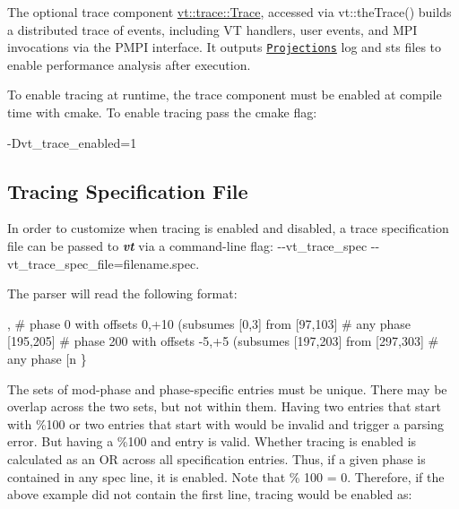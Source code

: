 The optional trace component {\ttfamily \hyperlink{structvt_1_1trace_1_1_trace}{vt\+::trace\+::\+Trace}}, accessed via {\ttfamily vt\+::the\+Trace()} builds a distributed trace of events, including VT handlers, user events, and M\+PI invocations via the P\+M\+PI interface. It outputs \href{http://charm.cs.uiuc.edu/software}{\tt Projections} log and sts files to enable performance analysis after execution.

To enable tracing at runtime, the trace component must be enabled at compile time with cmake. To enable tracing pass the cmake flag\+: 
\begin{DoxyCode}
-Dvt\_trace\_enabled=1
\end{DoxyCode}
\hypertarget{trace_tracing-spec-file}{}\subsection{Tracing Specification File}\label{trace_tracing-spec-file}
In order to customize when tracing is enabled and disabled, a trace specification file can be passed to {\bfseries {\itshape vt}} via a command-\/line flag\+: {\ttfamily -\/-\/vt\+\_\+trace\+\_\+spec -\/-\/vt\+\_\+trace\+\_\+spec\+\_\+file=filename.\+spec}.

The parser will read the following format\+:


, # phase 0 with offsets 0,+10 (subsumes [0,3] from %
  [97,103] # any phase %
  [195,205] # phase 200 with offsets -5,+5 (subsumes [197,203] from %
  [297,303] # any phase %
  [n%
\}
\end{DoxyCode}


The sets of mod-\/phase and phase-\/specific entries must be unique. There may be overlap across the two sets, but not within them. Having two entries that start with {\ttfamily \%100} or two entries that start with {} would be invalid and trigger a parsing error. But having a {\ttfamily \%100} and {} entry is valid. Whether tracing is enabled is calculated as an OR across all specification entries. Thus, if a given phase is contained in any spec line, it is enabled. Note that { \% 100 = 0}. Therefore, if the above example did not contain the first line, tracing would be enabled as\+:


